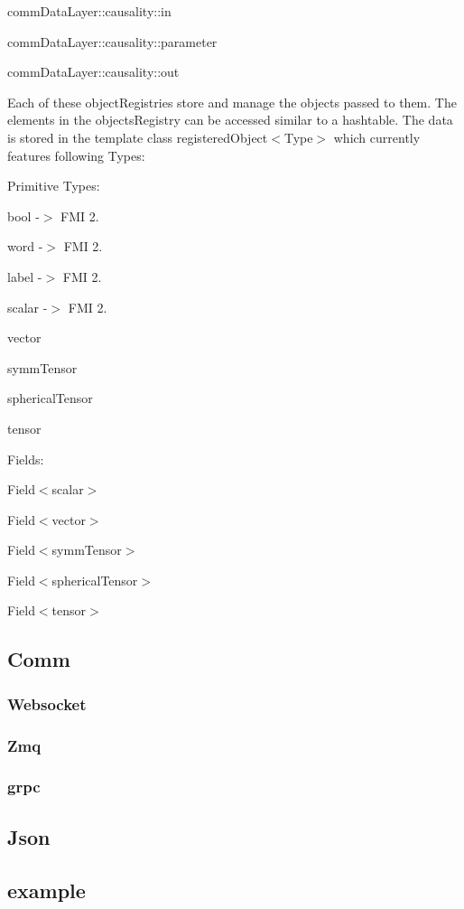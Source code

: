 \begin{DoxyItemize}
\item {\ttfamily comm\+Data\+Layer\+::causality\+::in}
\item {\ttfamily comm\+Data\+Layer\+::causality\+::parameter}
\item {\ttfamily comm\+Data\+Layer\+::causality\+::out}
\end{DoxyItemize}

Each of these {\ttfamily object\+Registries} store and manage the objects passed to them. The elements in the objects\+Registry can be accessed similar to a hashtable. The data is stored in the template class {\ttfamily registered\+Object$<$Type$>$} which currently features following Types\+:


\begin{DoxyItemize}
\item Primitive Types\+:
\begin{DoxyItemize}
\item {\ttfamily bool} -\/$>$ F\+MI 2.
\item {\ttfamily word} -\/$>$ F\+MI 2.
\item {\ttfamily label} -\/$>$ F\+MI 2.
\item {\ttfamily scalar} -\/$>$ F\+MI 2.
\item {\ttfamily vector}
\item {\ttfamily symm\+Tensor}
\item {\ttfamily spherical\+Tensor}
\item {\ttfamily tensor}
\end{DoxyItemize}
\item Fields\+:
\begin{DoxyItemize}
\item {\ttfamily Field$<$scalar$>$}
\item {\ttfamily Field$<$vector$>$}
\item {\ttfamily Field$<$symm\+Tensor$>$}
\item {\ttfamily Field$<$spherical\+Tensor$>$}
\item {\ttfamily Field$<$tensor$>$}
\end{DoxyItemize}
\end{DoxyItemize}

\subsection*{Comm}

\subsubsection*{Websocket}

\subsubsection*{Zmq}

\subsubsection*{grpc}

\subsection*{Json}

\subsection*{example}